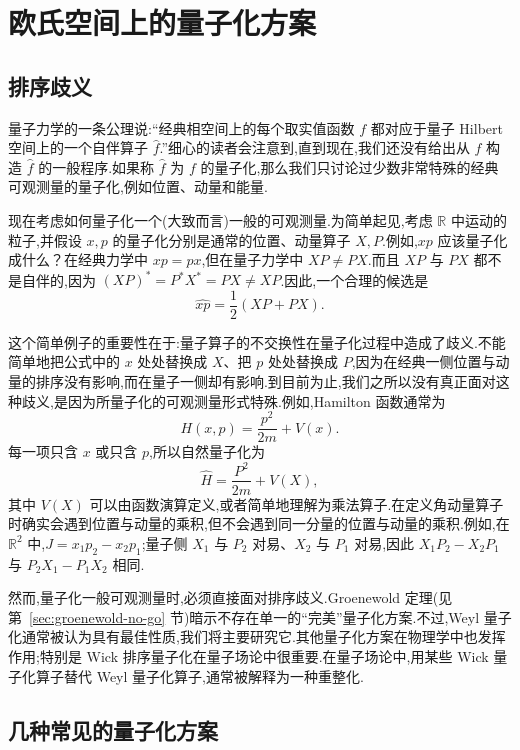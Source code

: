 \chapter{欧氏空间上的量子化方案}
\label{chap:quantization-schemes}

\section{排序歧义}
\label{sec:ordering-ambiguities}

量子力学的一条公理说:“经典相空间上的每个取实值函数 $f$ 都对应于量子 Hilbert 空间上的一个自伴算子 $\widehat f$.”细心的读者会注意到,直到现在,我们还没有给出从 $f$ 构造 $\widehat f$ 的一般程序.如果称 $\widehat f$ 为 $f$ 的量子化,那么我们只讨论过少数非常特殊的经典可观测量的量子化,例如位置、动量和能量.

现在考虑如何量子化一个(大致而言)一般的可观测量.为简单起见,考虑 $\mathbb R$ 中运动的粒子,并假设 $x,p$ 的量子化分别是通常的位置、动量算子 $X,P$.例如,$xp$ 应该量子化成什么？在经典力学中 $xp=px$,但在量子力学中 $XP\neq PX$.而且 $XP$ 与 $PX$ 都不是自伴的,因为 $(XP)^*=P^*X^*=PX\neq XP$.因此,一个合理的候选是
\[
\widehat{xp}=\frac12(XP+PX).
\]

这个简单例子的重要性在于:量子算子的不交换性在量子化过程中造成了歧义.不能简单地把公式中的 $x$ 处处替换成 $X$、把 $p$ 处处替换成 $P$,因为在经典一侧位置与动量的排序没有影响,而在量子一侧却有影响.到目前为止,我们之所以没有真正面对这种歧义,是因为所量子化的可观测量形式特殊.例如,Hamilton 函数通常为
\[
H(x,p)=\frac{p^2}{2m}+V(x).
\]
每一项只含 $x$ 或只含 $p$,所以自然量子化为
\[
\widehat H=\frac{P^2}{2m}+V(X),
\]
其中 $V(X)$ 可以由函数演算定义,或者简单地理解为乘法算子.在定义角动量算子时确实会遇到位置与动量的乘积,但不会遇到同一分量的位置与动量的乘积.例如,在 $\mathbb R^2$ 中,$J=x_1p_2-x_2p_1$;量子侧 $X_1$ 与 $P_2$ 对易、$X_2$ 与 $P_1$ 对易,因此 $X_1P_2-X_2P_1$ 与 $P_2X_1-P_1X_2$ 相同.

然而,量子化一般可观测量时,必须直接面对排序歧义.Groenewold 定理(见第~\ref{sec:groenewold-no-go} 节)暗示不存在单一的“完美”量子化方案.不过,Weyl 量子化通常被认为具有最佳性质,我们将主要研究它.其他量子化方案在物理学中也发挥作用;特别是 Wick 排序量子化在量子场论中很重要.在量子场论中,用某些 Wick 量子化算子替代 Weyl 量子化算子,通常被解释为一种重整化.

\section{几种常见的量子化方案}
\label{sec:common-quantization}

